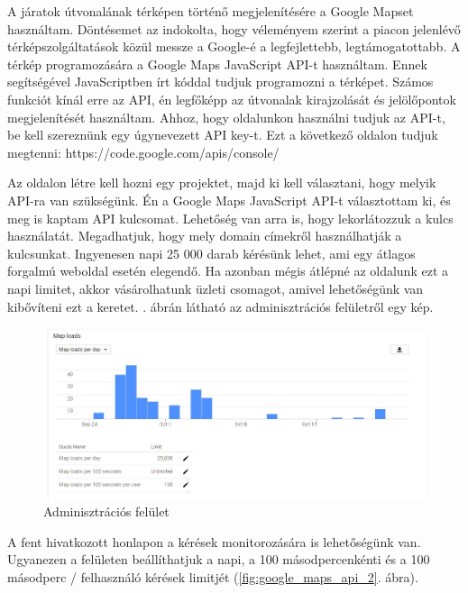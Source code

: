 
A járatok útvonalának térképen történő megjelenítésére a Google Mapset használtam. Döntésemet az indokolta, hogy véleményem szerint a piacon jelenlévő térképszolgáltatások közül messze a Google-é a legfejlettebb, legtámogatottabb. A térkép programozására a Google Maps JavaScript API-t használtam. Ennek segítségével JavaScriptben írt kóddal tudjuk programozni a térképet. Számos funkciót kínál erre az API, én legfőképp az útvonalak kirajzolását és jelölőpontok megjelenítését használtam. Ahhoz, hogy oldalunkon használni tudjuk az API-t, be kell szereznünk egy úgynevezett API key-t. Ezt a következő oldalon tudjuk megtenni: https://code.google.com/apis/console/

Az oldalon létre kell hozni egy projektet, majd ki kell választani, hogy melyik API-ra van szükségünk. Én a Google Maps JavaScript API-t választottam ki, és meg is kaptam API kulcsomat. Lehetőség van arra is, hogy lekorlátozzuk a kulcs használatát. Megadhatjuk, hogy mely domain címekről használhatják a kulcsunkat. Ingyenesen napi 25 000 darab kérésünk lehet, ami egy átlagos forgalmú weboldal esetén elegendő. Ha azonban mégis átlépné az oldalunk ezt a napi limitet, akkor vásárolhatunk üzleti csomagot, amivel lehetőségünk van kibővíteni ezt a keretet. . ábrán látható az adminisztrációs felületről egy kép.

\begin{figure}[h!]
\centering
\includegraphics[scale=0.5]{kepek/google_maps_api_1.jpg}
\caption{Adminisztrációs felület}
\label{fig:google_maps_api_1}
\end{figure}

A fent hivatkozott honlapon a kérések monitorozására is lehetőségünk van. Ugyanezen a felületen beállíthatjuk a napi, a 100 másodpercenkénti és a 100 másodperc / felhasználó kérések limitjét (\ref{fig:google_maps_api_2}. ábra).

